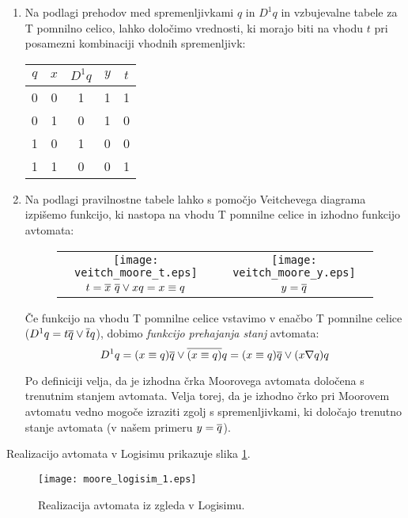 \begin{resitev}
\begin{enumerate}
\bigskip

\item Na podlagi prehodov med spremenljivkami $q$ in $D^1q$ in vzbujevalne tabele za T pomnilno celico, lahko določimo vrednosti, ki morajo biti na vhodu $t$ pri posamezni kombinaciji vhodnih spremenljivk:

\begin{center}
\begin{tabular}{cc|cc|c}
 $q$ & $x$ & $D^1 q$ & $y$ & $t$\\
 \hline
 0 & 0 & 1 & 1 & 1 \\		 
 0 & 1 & 0 & 1 & 0 \\
 1 & 0 & 1 & 0 & 0 \\
 1 & 1 & 0 & 0 & 1 \\
\end{tabular}
\end{center}

\bigskip

\item Na podlagi pravilnostne tabele lahko s pomočjo Veitchevega diagrama izpišemo funkcijo, ki nastopa na vhodu T pomnilne celice in izhodno funkcijo avtomata:


\begin{figure}[!ht]
\begin{center}
\begin{tabular}{cc}
\texttt{[image: veitch\_moore\_t.eps]} &
\texttt{[image: veitch\_moore\_y.eps]} \\
$t = \ol x\ \ol q \vee x q = x \equiv q$ & $y = \overline q$\\
\end{tabular}
\end{center}
\end{figure}


Če funkcijo na vhodu T pomnilne celice vstavimo v enačbo T pomnilne celice ($D^1 q = t \overline q \vee \overline t q$), dobimo \emph{funkcijo prehajanja stanj} avtomata:
$$
D^1q = (x \equiv q) \overline q \vee \overline{(x \equiv q)} q = (x \equiv q) \overline q \vee (x \nabla q) q 
$$ 

Po definiciji velja, da je izhodna črka Moorovega avtomata določena s trenutnim stanjem avtomata. Velja torej, da je izhodno črko pri Moorovem avtomatu vedno mogoče izraziti zgolj s spremenljivkami, ki določajo trenutno stanje avtomata (v našem primeru $y=\overline q$).

\end{enumerate}

\bigskip

Realizacijo avtomata v Logisimu prikazuje slika \ref{fig:logisim1}.


\begin{figure}[ht]
\begin{center}
\texttt{[image: moore\_logisim\_1.eps]}
\end{center}
\caption{Realizacija avtomata iz zgleda v Logisimu.}
\label{fig:logisim1}
\end{figure}

\end{resitev}

